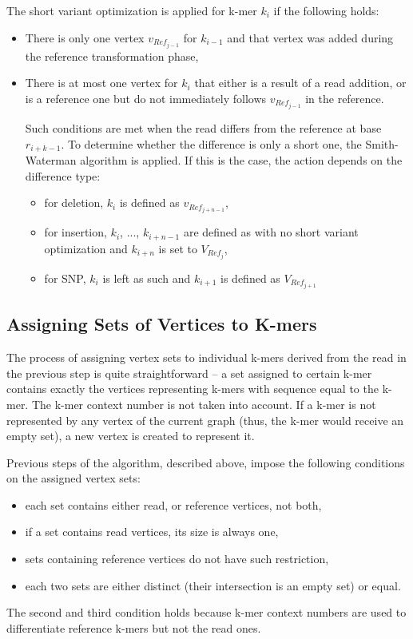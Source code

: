 The short variant optimization is applied for k-mer $k_i$ if the following holds:
\begin{itemize}
\item There is only one vertex $v_{Ref_{j-1}}$ for $k_{i-1}$ and that vertex was added during the reference transformation phase,
\item There is at most one vertex for $k_i$ that either is a result of a read addition, or is a reference one but do not immediately follows  $v_{Ref_{j-1}}$ in the reference.

Such conditions are met when the read differs from the reference at base $r_{i+k-1}$. To determine whether the difference is only a short one, the Smith-Waterman algorithm is applied. If this is the case, the action depends on the difference type:
\begin{itemize}
\item for deletion, $k_i$ is defined as $v_{Ref_{j + n - 1}}$,
\item for insertion, $k_i$, ..., $k_{i + n - 1}$ are defined as with no short variant optimization and $k_{i + n}$ is set to $V_{Ref_{j}}$,
\item for SNP, $k_i$ is left as such and $k_{i+1}$ is defined as $V_{Ref_{j+1}}$
\end{itemize}
\end{itemize}

\subsection{Assigning Sets of Vertices to K-mers}
\label{subsec:assign-sets}

The process of assigning vertex sets to individual k-mers derived from the read in the previous step is quite straightforward – a set assigned to certain k-mer contains exactly the vertices representing k-mers with sequence equal to the k-mer. The k-mer context number is not taken into account. If a k-mer is not represented by any vertex of the current graph (thus, the k-mer would receive an empty set), a new vertex is created to represent it.

Previous steps of the algorithm, described above, impose the following conditions on the assigned vertex sets:
\begin{itemize}
\item each set contains either read, or reference vertices, not both,
\item if a set contains read vertices, its size is always one,
\item sets containing reference vertices do not have such restriction,
\item each two sets are either distinct (their intersection is an empty set) or equal.
\end{itemize}
The second and third condition holds because k-mer context numbers are used to differentiate reference k-mers but not the read ones. 

